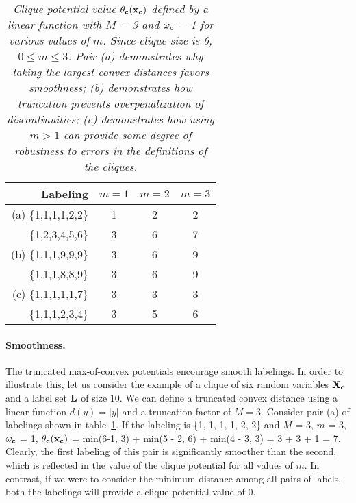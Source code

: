 \documentclass[10pt,letterpaper]{article}
\newcommand{\myparagraph}[1]{\vspace{0mm}\paragraph{#1}}
\newcommand{\mycaption}[1]{\vspace{0mm}\caption{#1}\vspace{0mm}}
\begin{document}
\begin{table}[h!]
\begin{center}

\begin{tabular}{|r|c|c|c|}
\hline
Labeling & $m=1$ & $m=2$ & $m=3$ \\
\hline
(a) \{1,1,1,1,2,2\} & 1 & 2 & 2 \\
\{1,2,3,4,5,6\} & 3 & 6 & 7 \\
\hline
(b) \{1,1,1,9,9,9\} & 3 & 6 & 9 \\
\{1,1,1,8,8,9\} & 3 & 6 & 9 \\
\hline
(c) \{1,1,1,1,1,7\} & 3 & 3 & 3 \\
\{1,1,1,2,3,4\} & 3 & 5 & 6 \\
\hline
\end{tabular}

\mycaption{\footnotesize \em Clique potential value $\theta_{\bf c}({\bf x}_{\bf c})$ defined by a linear function with $M$ = 3 and $\bf{\omega_c}$ = 1 for various
		values of $m$. Since clique size is 6, $0 \leq m \leq 3$. Pair (a)
		demonstrates why taking the largest convex distances favors smoothness; (b) demonstrates how truncation prevents overpenalization of
		discontinuities; (c) demonstrates how using $m > 1$ can provide some degree of robustness to errors in the definitions of the cliques.
}
\label{table:cliqueExample}
\end{center}
\end{table}

\myparagraph{\bf Smoothness.} The truncated max-of-convex potentials encourage smooth labelings. In order to illustrate this, let us consider the
example of a clique of six random variables ${\bf X}_{\bf c}$ and a label set ${\bf L}$ of size $10$. We can define a truncated convex distance
using a linear function $d(y) = |y|$ and a truncation factor of $M=3$. Consider pair (a) of labelings shown
in table~\ref{table:cliqueExample}. If the labeling is \{1, 1, 1, 1, 2, 2\} and $M$ = 3, $m$ = 3, $\bf\omega_c$ = 1, $\theta_{\bf c}({\bf x}_{\bf c})$ = min(6-1, 3) + min(5 - 2, 6) + min(4 - 3, 3) = 3 + 3 + 1 = 7. Clearly, the first labeling of this pair is significantly smoother than the second, which is reflected in the value of the
clique potential for all values of $m$. In contrast, if we were to consider the minimum distance among all pairs of labels, both the labelings will
provide a clique potential value of $0$.  
\vspace{-1mm}
\end{document}
